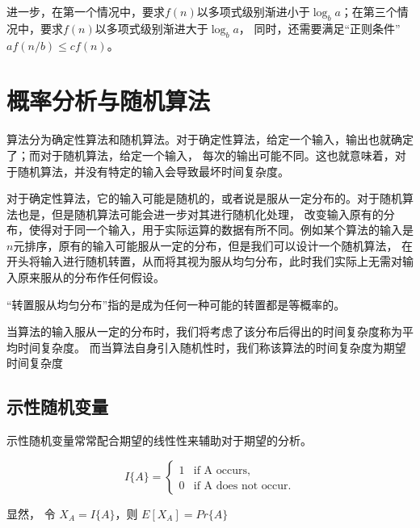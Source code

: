 进一步，在第一个情况中，要求$f(n)$以多项式级别渐进小于$\log_ba$；在第三个情况中，要求$f(n)$以多项式级别渐进大于$\log_ba$，
同时，还需要满足“正则条件”$af(n/b)\leq cf(n)$。
\section{概率分析与随机算法}
算法分为确定性算法和随机算法。对于确定性算法，给定一个输入，输出也就确定了；而对于随机算法，给定一个输入，
每次的输出可能不同。这也就意味着，对于随机算法，并没有特定的输入会导致最坏时间复杂度。

对于确定性算法，它的输入可能是随机的，或者说是服从一定分布的。对于随机算法也是，但是随机算法可能会进一步对其进行随机化处理，
改变输入原有的分布，使得对于同一个输入，用于实际运算的数据有所不同。例如某个算法的输入是 $n$元排序，原有的输入可能服从一定的分布，但是我们可以设计一个随机算法，
在开头将输入进行随机转置，从而将其视为服从均匀分布，此时我们实际上无需对输入原来服从的分布作任何假设。
\begin{myrmk}
    “转置服从均匀分布”指的是成为任何一种可能的转置都是等概率的。
\end{myrmk}
当算法的输入服从一定的分布时，我们将考虑了该分布后得出的时间复杂度称为平均时间复杂度。
而当算法自身引入随机性时，我们称该算法的时间复杂度为期望时间复杂度
\subsection{示性随机变量}
示性随机变量常常配合期望的线性性来辅助对于期望的分析。
\begin{mydef}[示性随机变量$I$]
    \[I\{A\}=\begin{cases}
        1& \text{if A occurs,}\\
        0& \text{if A does not occur.}
    \end{cases}\]
\end{mydef}
显然， 令 $X_A=I\{A\}$，则 $E[X_A]=Pr\{A\}$